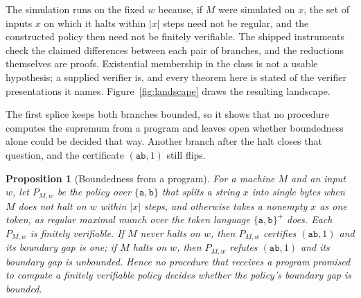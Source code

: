 \documentclass[11pt,a4paper]{article}
\theoremstyle{definition}
\theoremstyle{plain}
\newtheorem{proposition}{Proposition}
\newcommand{\code}[1]{\texttt{#1}}
\begin{document}
The simulation runs on the fixed $w$ because, if $M$ were simulated on $x$, the set of inputs $x$ on which it halts
within $|x|$ steps need not be regular, and the constructed policy then need not be finitely verifiable. The shipped
instruments check the claimed differences between each pair of branches, and the reductions themselves are proofs.
Existential membership in the class is not a usable hypothesis; a supplied verifier is, and every theorem here is stated
of the verifier presentations it names. Figure~\ref{fig:landscape} draws the resulting landscape.

The first splice keeps both branches bounded, so it shows that no procedure computes the supremum from a program and
leaves open whether boundedness alone could be decided that way. Another branch after the halt closes that question, and
the certificate $(\code{ab}, 1)$ still flips.

\begin{proposition}[Boundedness from a program]\label{prop:gap-bounded} For a machine $M$ and an input $w$, let $P_{M,w}$ be the policy over $\{\code{a}, \code{b}\}$ that splits a string $x$ into single bytes when $M$ does
not halt on $w$ within $|x|$ steps, and otherwise takes a nonempty $x$ as one token, as regular maximal munch over the
token language $\{\code{a}, \code{b}\}^{+}$ does. Each $P_{M,w}$ is finitely verifiable. If $M$ never halts on $w$, then
$P_{M,w}$ certifies $(\code{ab}, 1)$ and its boundary gap is one; if $M$ halts on $w$, then $P_{M,w}$ refutes
$(\code{ab}, 1)$ and its boundary gap is unbounded. Hence no procedure that receives a program promised to compute a
finitely verifiable policy decides whether the policy's boundary gap is bounded.
\end{proposition}
\end{document}
